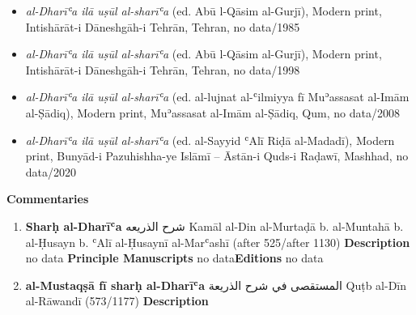 \documentclass{article}
\begin{document}
\begin{enumerate}
\begin{itemize}
        \item \emph{al-Dharīʿa ilā uṣūl al-sharīʿa} (ed. Abū l-Qāsim al-Gurjī), Modern print, Intishārāt-i Dāneshgāh-i Tehrān, Tehran, no data/1985
        
        \item \emph{al-Dharīʿa ilā uṣūl al-sharīʿa} (ed. Abū l-Qāsim al-Gurjī), Modern print, Intishārāt-i Dāneshgāh-i Tehrān, Tehran, no data/1998
        
        \item \emph{al-Dharīʿa ilā uṣūl al-sharīʿa} (ed. al-lujnat al-ʿilmiyya fī Muʾassasat al-Imām al-Ṣādiq), Modern print, Muʾassasat al-Imām al-Ṣādiq, Qum, no data/2008
        
        \item \emph{al-Dharīʿa ilā uṣūl al-sharīʿa} (ed. al-Sayyid ʿAlī Riḍā al-Madadī), Modern print, Bunyād-i Pazuhishha-ye Islāmī – Āstān-i Quds-i Raḍawī, Mashhad, no data/2020
        \end{itemize}
\textbf{Commentaries}
\begin{enumerate}
      \item \textbf{Sharḥ al-Dharīʿa}
        \newline
        \textarabic{شرح الذريعه}
        \newline
        Kamāl al-Din al-Murtaḍā b. al-Muntahā b. al-Ḥusayn b. ʿAlī al-Ḥusaynī al-Marʿashī
        \newline
        (after 525/after 1130)
        \newline
        \newline
        \textbf{Description}
        \newline	
        no data
        \newline
        \newline
    \textbf{Principle Manuscripts}
\newline
no data\newline\textbf{Editions}
\newline
no data\newline
      \item \textbf{al-Mustaqṣā fī sharḥ al-Dharīʿa}
        \newline
        \textarabic{المستقصى في شرح الذريعة}
        \newline
        Quṭb al-Dīn al-Rāwandī
        \newline
        (573/1177)
        \newline
        \newline
        \textbf{Description}
        \newline	

\end{enumerate}
\end{enumerate}
\end{document}
